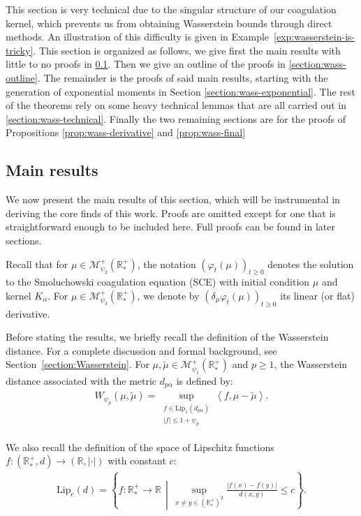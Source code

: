 \documentclass[11pt,a4paper]{article}
\newcommand{\RR}{\mathbb{R}}
\newcommand{\RRP}{\mathbb{R}^+_*}
\newcommand{\MC}{\mathcal{M}}
\newcommand{\Proc}[1]{\left(#1\right)_{t\geq 0}}
\newcommand{\brac}[1]{\left\langle#1\right\rangle}
\begin{document}
This section is very technical due to the singular structure of our coagulation kernel, which prevents us from obtaining Wasserstein bounds through direct methods. An illustration of this difficulty is given in Example~\ref{exp:wasserstein-is-tricky}. This section is organized as follows, we give first the main results with little to no proofs in \ref{section:wass-main-results}. Then we give an outline of the proofs in \ref{section:wass-outline}. The remainder is the proofs of said main results, starting with the generation of exponential moments in Section \ref{section:wass-exponential}. The rest of the theorems rely on some heavy technical lemmas that are all carried out in \ref{section:wass-technical}. Finally the two remaining sections are for the proofs of Propositions \ref{prop:wass-derivative} and \ref{prop:wass-final}

\subsection{Main results}\label{section:wass-main-results}
We now present the main results of this section, which will be instrumental in deriving the core finds of this work. Proofs are omitted except for one that is straightforward enough to be included here. Full proofs can be found in later sections.

Recall that for $\mu \in \MC^+_{\psi_2}(\RRP)$, the notation $\Proc{\varphi_t(\mu)}$ denotes the solution to the Smoluchowski coagulation equation (SCE) with initial condition $\mu$ and kernel $K_\alpha$. For $\mu \in \MC^+_{\psi_3}(\RRP)$, we denote by $\Proc{\delta_\mu\varphi_t(\mu)}$ its linear (or flat) derivative.

Before stating the results, we briefly recall the definition of the Wasserstein distance. For a complete discussion and formal background, see Section~\ref{section:Wasserstein}. For $\mu, \tilde{\mu} \in \MC_{\psi_1}^+(\RRP)$ and $p \geq 1$, the Wasserstein distance associated with the metric $d_{p\alpha}$ is defined by:
\begin{align*}
    W_{\psi_p}(\mu,\tilde{\mu}) = \sup\limits_{\substack{f \in \mathrm{Lip}_1(d_{p\alpha}) \\ |f| \leq 1 + \psi_p}} \brac{f, \mu - \tilde{\mu}}.
\end{align*}

We also recall the definition of the space of Lipschitz functions $f: (\RRP, d) \to (\RR, |\cdot|)$ with constant $c$:
\begin{align*}
    \mathrm{Lip}_c(d) = \left\lbrace f: \RRP \to \RR \,\middle|\, \sup\limits_{x \neq y \in (\RRP)^2} \frac{|f(x) - f(y)|}{d(x,y)} \leq c \right\rbrace.
\end{align*}
\end{document}
